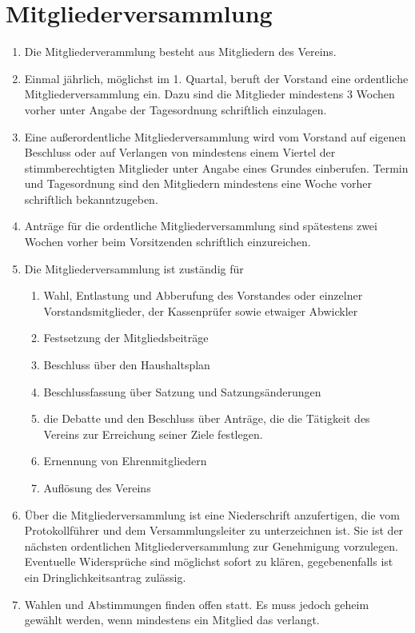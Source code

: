 \documentclass[11pt]{article}
\begin{document}
\section{Mitgliederversammlung}
\begin{enumerate}[label=\arabic*)]
	\item Die Mitgliederverammlung besteht aus Mitgliedern des Vereins.
	\item Einmal jährlich, möglichst im 1. Quartal, beruft der Vorstand eine ordentliche Mitgliederversammlung ein. Dazu sind die Mitglieder mindestens 3 Wochen vorher unter Angabe der Tagesordnung schriftlich einzulagen.
	\item Eine außerordentliche Mitgliederversammlung wird vom Vorstand auf eigenen Beschluss oder auf Verlangen von mindestens einem Viertel der stimmberechtigten Mitglieder unter Angabe eines Grundes einberufen. Termin und Tagesordnung sind den Mitgliedern mindestens eine Woche vorher schriftlich bekanntzugeben.
	\item Anträge für die ordentliche Mitgliederversammlung sind spätestens zwei Wochen vorher beim Vorsitzenden schriftlich einzureichen.
	\item Die Mitgliederversammlung ist zuständig für
	\begin{enumerate}[label=\alph*)]
		\item Wahl, Entlastung und Abberufung des Vorstandes oder einzelner Vorstandsmitglieder, der Kassenprüfer sowie etwaiger Abwickler
		\item Festsetzung der Mitgliedsbeiträge
		\item Beschluss über den Haushaltsplan
		\item Beschlussfassung über Satzung und Satzungsänderungen
		\item die Debatte und den Beschluss über Anträge, die die Tätigkeit des Vereins zur Erreichung seiner Ziele festlegen.
		\item Ernennung von Ehrenmitgliedern
		\item Auflösung des Vereins		
	\end{enumerate}
	\item Über die Mitgliederversammlung ist eine Niederschrift anzufertigen, die vom Protokollführer und dem Versammlungsleiter zu unterzeichnen ist. Sie ist der nächsten ordentlichen Mitgliederversammlung zur Genehmigung vorzulegen. Eventuelle Widersprüche sind möglichst sofort zu klären, gegebenenfalls ist ein Dringlichkeitsantrag zulässig.
	\item Wahlen und Abstimmungen finden offen statt. Es muss jedoch geheim gewählt werden, wenn mindestens ein Mitglied das verlangt.

\end{enumerate}
\end{document}
